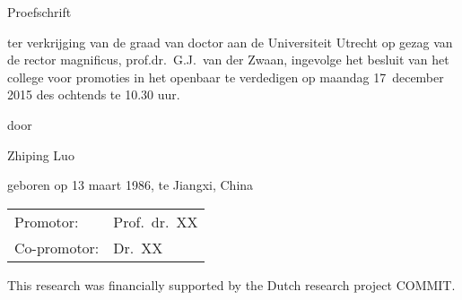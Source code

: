 \begin{titlepage}
\vfill
\begin{center}
\noindent\LARGE Proefschrift
\par
\bigskip
\par\noindent\normalsize  ter verkrijging van de graad van doctor aan de Universiteit Utrecht op gezag van de rector magnificus, prof.dr.~G.J.~van der Zwaan, ingevolge het besluit van het college voor promoties in het openbaar te verdedigen op maandag 17~december 2015 des
ochtends te 10.30 uur.
\end{center}
\vspace*{1ex}
\begin{center}
\noindent
door
\end{center}

\vspace*{1ex}

\begin{center}
\LARGE Zhiping Luo
\par
\bigskip
\par\noindent\normalsize geboren op 13 maart 1986, te Jiangxi, China
\end{center}

\newpage
\thispagestyle{empty}%
\noindent
\begin{tabular}{ll}
Promotor: & Prof.~dr.~XX\\
Co-promotor: & Dr.~XX\\
\end{tabular}%

\vfill

\medskip

\noindent
	This research was financially supported by the Dutch research project COMMIT.

\end{titlepage}

